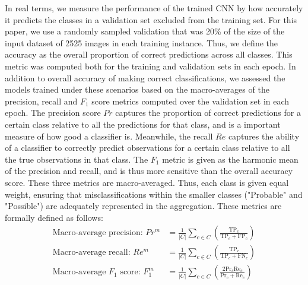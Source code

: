 \documentclass[Journal,letterpaper, SingleSpace, InsideFigs]{ascelike-new}
\begin{document}
In real terms, we measure the performance of the trained CNN by how accurately it predicts the classes in a validation set excluded from the training set. For this paper, we use a randomly sampled validation that was 20\% of the size of the input dataset of 2525 images in each training instance.
Thus, we define the accuracy as the overall proportion of correct predictions across all classes.
This metric was computed both for the training and validation sets in each epoch.
In addition to overall accuracy of making correct classifications, we assessed the models trained under these scenarios based on the macro-averages of the precision, recall and $F_1$ score metrics computed over the validation set in each epoch. The precision score $Pr$ captures the proportion of correct predictions for a certain class relative to all the predictions for that class, and is a important measure of how good a classifier is. Meanwhile, the recall $Re$ captures the ability of a classifier to correctly predict observations for a certain class relative to all the true observations in that class. The $F_1$ metric is given as the harmonic mean of the precision and recall, and is thus more sensitive than the overall accuracy score. These three metrics are macro-averaged. Thus, each class is given equal weight, ensuring that misclassifications within the smaller classes ("Probable" and "Possible") are adequately represented in the aggregation. These metrics are formally defined as follows:
\begin{align}
\text{Macro-average precision: }    Pr^m &= \frac{1}{|C|}\sum_{c\in C} \left(  \frac{ \mathrm{TP}_{c} }{\mathrm{TP}_{c} + \mathrm{FP}_c}\right) \\
\text{Macro-average recall: }    Re^m &= \frac{1}{|C|} \sum_{c\in C} \left(  \frac{ \mathrm{TP}_{c} }{\mathrm{TP}_{c} + \mathrm{FN}_c}\right) \\
\text{Macro-average $F_1$ score: }    F_1^m &= \frac{1}{|C|} \sum_{c\in C} \left(  \frac{2  \mathrm{Pr}_{c} \mathrm{Re}_{c}}{\mathrm{Pr}_{c} + \mathrm{Re}_c}\right)
\end{align}
\end{document}
